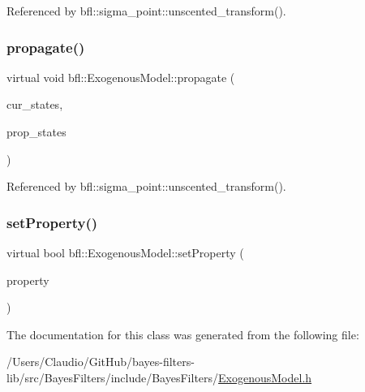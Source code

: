 Referenced by bfl\+::sigma\+\_\+point\+::unscented\+\_\+transform().

\mbox{\label{classbfl_1_1ExogenousModel_a9f3ec7b8fa1a6c1bb4f5889ba85e6d91}} 
\subsubsection{\texorpdfstring{propagate()}{propagate()}}
{\footnotesize\ttfamily virtual void bfl\+::\+Exogenous\+Model\+::propagate (\begin{DoxyParamCaption}\item[{const Eigen\+::\+Ref$<$ const Eigen\+::\+Matrix\+Xd $>$ \&}]{cur\+\_\+states,  }\item[{Eigen\+::\+Ref$<$ Eigen\+::\+Matrix\+Xd $>$}]{prop\+\_\+states }\end{DoxyParamCaption})\hspace{0.3cm}{\ttfamily [pure virtual]}}



Referenced by bfl\+::sigma\+\_\+point\+::unscented\+\_\+transform().

\mbox{\label{classbfl_1_1ExogenousModel_a240432e20121e83787c83de64360a58a}} 
\subsubsection{\texorpdfstring{set\+Property()}{setProperty()}}
{\footnotesize\ttfamily virtual bool bfl\+::\+Exogenous\+Model\+::set\+Property (\begin{DoxyParamCaption}\item[{const std\+::string \&}]{property }\end{DoxyParamCaption})\hspace{0.3cm}{\ttfamily [pure virtual]}}



The documentation for this class was generated from the following file\+:\begin{DoxyCompactItemize}
\item 
/\+Users/\+Claudio/\+Git\+Hub/bayes-\/filters-\/lib/src/\+Bayes\+Filters/include/\+Bayes\+Filters/\mbox{\hyperlink{ExogenousModel_8h}{Exogenous\+Model.\+h}}\end{DoxyCompactItemize}
